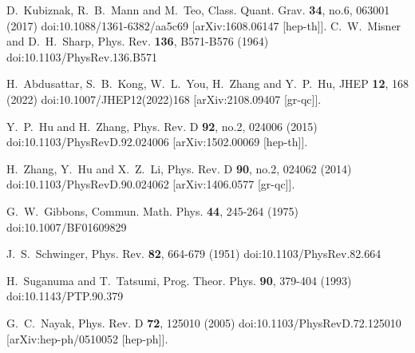 \documentclass[a4paper,11pt]{article}
\begin{document}
\begin{thebibliography}{100}
D.~Kubiznak, R.~B.~Mann and M.~Teo,
Class. Quant. Grav. \textbf{34}, no.6, 063001 (2017)
doi:10.1088/1361-6382/aa5c69
[arXiv:1608.06147 [hep-th]].
C.~W.~Misner and D.~H.~Sharp,
Phys. Rev. \textbf{136}, B571-B576 (1964)
doi:10.1103/PhysRev.136.B571

H.~Abdusattar, S.~B.~Kong, W.~L.~You, H.~Zhang and Y.~P.~Hu,
JHEP \textbf{12}, 168 (2022)
doi:10.1007/JHEP12(2022)168
[arXiv:2108.09407 [gr-qc]].

Y.~P.~Hu and H.~Zhang,
Phys. Rev. D \textbf{92}, no.2, 024006 (2015)
doi:10.1103/PhysRevD.92.024006
[arXiv:1502.00069 [hep-th]].

H.~Zhang, Y.~Hu and X.~Z.~Li,
Phys. Rev. D \textbf{90}, no.2, 024062 (2014)
doi:10.1103/PhysRevD.90.024062
[arXiv:1406.0577 [gr-qc]].

G.~W.~Gibbons,
Commun. Math. Phys. \textbf{44}, 245-264 (1975)
doi:10.1007/BF01609829

J.~S.~Schwinger,
Phys. Rev. \textbf{82}, 664-679 (1951)
doi:10.1103/PhysRev.82.664

H.~Suganuma and T.~Tatsumi,
Prog. Theor. Phys. \textbf{90}, 379-404 (1993)
doi:10.1143/PTP.90.379

G.~C.~Nayak,
Phys. Rev. D \textbf{72}, 125010 (2005)
doi:10.1103/PhysRevD.72.125010
[arXiv:hep-ph/0510052 [hep-ph]].


\end{thebibliography}
\end{document}

